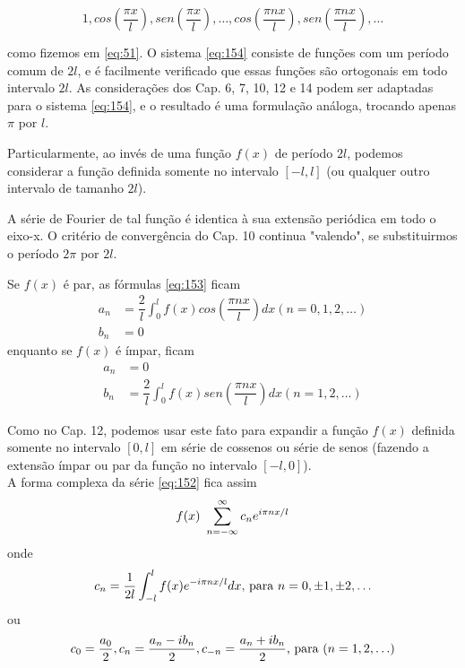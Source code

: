 \begin{equation}
\label{eq:154}
    1, cos\left(\dfrac{\pi x}{l}\right), sen\left(\dfrac{\pi x}{l}\right), \ldots, cos\left(\dfrac{\pi nx}{l}\right), sen\left(\dfrac{\pi nx}{l}\right), \ldots
\end{equation} 

como fizemos em \ref{eq:51}. O sistema \ref{eq:154} consiste de funções com um período comum
de $2l$, e é facilmente verificado que essas funções são ortogonais em todo intervalo $2l$.
As considerações dos Cap. 6, 7, 10, 12 e 14 podem ser adaptadas para o sistema \ref{eq:154},
e o resultado é uma formulação análoga, trocando apenas $\pi$ por $l$.

Particularmente, ao invés de uma função $f(x)$ de período $2l$, podemos considerar a 
função definida somente no intervalo $[-l, l]$ (ou qualquer outro intervalo de tamanho $2l$).

A série de Fourier de tal função é identica à sua extensão periódica em todo o eixo-x. O
critério de convergência do Cap. 10 continua "valendo", se substituirmos o período $2\pi$ por
$2l$.

Se $f(x)$ é par, as fórmulas \ref{eq:153} ficam
\begin{equation}
\label{eq:155}
    \begin{split}
        a_n &= \dfrac{2}{l}\int_{0}^{l}f(x)cos\left(\dfrac{\pi nx}{l}\right)dx (n = 0, 1, 2, \ldots)\\
        b_n &= 0
    \end{split}
\end{equation}
enquanto se $f(x)$ é ímpar, ficam
\begin{equation}
\label{eq:156}
    \begin{split}
        a_n &= 0\\
        b_n &= \dfrac{2}{l}\int_{0}^{l}f(x)sen\left(\dfrac{\pi nx}{l}\right)dx (n = 1, 2, \ldots)
    \end{split}
\end{equation}

Como no Cap. 12, podemos usar este fato para expandir a função $f(x)$ definida somente no
intervalo $[0, l]$ em série de cossenos ou série de senos (fazendo a extensão ímpar ou par
da função no intervalo $[-l, 0]$).\\

A forma complexa da série \ref{eq:152} fica assim
\begin{equation}
    \notag
    f(x) ~ \sum\limits_{n=-\infty}^{\infty}c_n e^{i\pi nx/l}
\end{equation}
onde 
\begin{equation}
\notag
    c_n = \dfrac{1}{2l}\int_{-l}^{l}f(x)e^{-i\pi nx/l}dx\text{, para }n = 0, \pm 1, \pm 2, \ldots
\end{equation} 
ou
\begin{equation}
\notag
    c_0 = \dfrac{a_0}{2}, c_n = \dfrac{a_n - ib_n}{2}, c_{-n}=\dfrac{a_n + ib_n}{2}\text{, para }(n = 1, 2, \ldots)
\end{equation} 